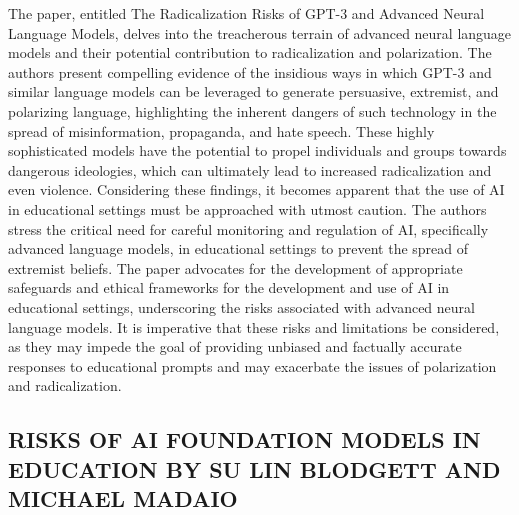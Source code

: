 \documentclass[letterpaper, 10 pt, conference]{ieeeconf}  %
\begin{document}
The paper, entitled The Radicalization Risks of GPT-3 and Advanced Neural Language Models, delves into the
treacherous terrain of advanced neural language models and their potential contribution to radicalization and polarization. The
authors present compelling evidence of the insidious ways in which GPT-3 and similar language models can be leveraged to
generate persuasive, extremist, and polarizing language, highlighting the inherent dangers of such technology in the spread of
misinformation, propaganda, and hate speech. These highly sophisticated models have the potential to propel individuals and
groups towards dangerous ideologies, which can ultimately lead to increased radicalization and even violence.
Considering these findings, it becomes apparent that the use of AI in educational settings must be approached with utmost
caution. The authors stress the critical need for careful monitoring and regulation of AI, specifically advanced language models, in
educational settings to prevent the spread of extremist beliefs. The paper advocates for the development of appropriate safeguards
and ethical frameworks for the development and use of AI in educational settings, underscoring the risks associated with advanced
neural language models. It is imperative that these risks and limitations be considered, as they may impede the goal of providing
unbiased and factually accurate responses to educational prompts and may exacerbate the issues of polarization and radicalization.

\subsection{RISKS OF AI FOUNDATION MODELS IN EDUCATION BY SU LIN BLODGETT AND MICHAEL MADAIO}
\end{document}
